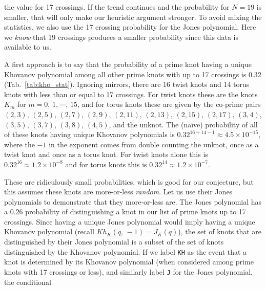 \documentclass{article}
\theoremstyle{plain}
\begin{document}
        the value for 17 crossings. If the trend continues and the probability
        for $N=19$ is smaller, that will only make our heuristic argument
        stronger. To avoid mixing the statistics, we also use the 17 crossing
        probability for the Jones polynomial. Here we \textit{know} that
        19 crossings produces a smaller probability since this data is
        available to us.
        \par\hfill\par
        A first approach is to say that the probability of a prime knot having a
        unique Khovanov polynomial among all other prime
        knots with up to 17 crossings is 0.32 (Tab.~\ref{tab:kho_stat}).
        Ignoring mirrors, there are 16 twist knots and 14 torus knots with
        less than or equal to 17 crossings. For twist knots these are the knots
        $K_{m}$ for $m=0,\,1,\,\cdots,\,15$, and for torus knots these are given
        by the co-prime pairs
        $(2, 3)$, $(2, 5)$, $(2, 7)$, $(2, 9)$, $(2, 11)$, $(2, 13)$,
        $(2, 15)$, $(2, 17)$, $(3, 4)$, $(3, 5)$, $(3, 7)$, $(3, 8)$, $(4, 5)$,
        and the unknot.
        The (na\"{i}ve) probability of all of these knots having unique
        Khovanov polynomials is $0.32^{16+14-1}\approx{4.5}\times{10}^{-15}$, where
        the $-1$ in the exponent comes from double counting the unknot, once as
        a twist knot and once as a torus knot.
        For twist knots alone this is $0.32^{16}\approx{1.2}\times{10}^{-8}$ and
        for torus knots this is $0.32^{14}\approx{1.2}\times{10}^{-7}$.
        \par\hfill\par
        These are ridiculously small probabilities, which is good for our
        conjecture,
        but this assumes these knots are more-or-less \textit{random}.
        Let us use their Jones polynomials to demonstrate that they more-or-less
        are. The Jones polynomial
        has a $0.26$ probability of distinguishing a knot in our list of prime knots
        up to 17 crossings. Since having a unique Jones polynomial would imply
        having a unique Khovanov polynomial (recall $Kh_{K}(q,\,-1)=J_{K}(q)$),
        the set of knots
        that are distinguished by their Jones polynomial is a subset of the set of
        knots distinguished by the Khovanov polynomial. If we label
        \texttt{KH} as the event that a knot is determined by its Khovanov
        polynomial (when considered among prime knots with 17 crossings or less),
        and similarly label \texttt{J} for the Jones polynomial, the conditional
\end{document}
